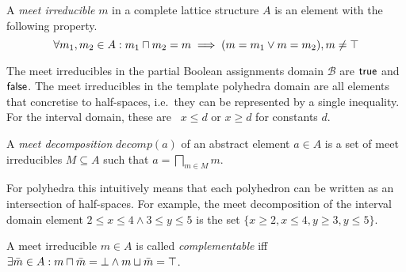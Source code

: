 \begin{definition} 
A \emph{meet irreducible} $m$ 
in a complete lattice structure $A$ is an element with the following property.
\[\forall m_1, m_2 \in A: m_1 \sqcap m_2 = m \implies (m = m_1 \lor m = m_2), m \neq \top \]  
\end{definition}

The meet irreducibles in the partial Boolean assignments domain
$\mathcal{B}$ are $\mathsf{true}$ and $\mathsf{false}$. The meet irreducibles in the
template polyhedra domain are all elements that concretise to
half-spaces, i.e.\ they can be represented by a single inequality. For
the interval domain, these are \ $x \leq d$ or $x \geq d$ for
constants $d$.


\begin{definition}
 A \emph{meet decomposition} $\mathit{decomp}(a)$ of an abstract
element $a \in A$ is a set of meet irreducibles $M \subseteq A$ such that 
$a=\bigsqcap_{m\in M} m$.
\end{definition}

For polyhedra this intuitively means that each polyhedron can be
written as an intersection of half-spaces.
%
For example, the meet decomposition of the interval domain element
$2\leq x\leq 4 \wedge 3\leq y\leq 5$ is
the set $\{x\geq 2, x\leq 4, y\geq 3, y\leq 5\}$.

\begin{definition} 
A meet irreducible $m\in A$ is called \emph{complementable} iff $\exists
\bar{m} \in A: m\sqcap\bar{m}=\bot \wedge m\sqcup\bar{m}=\top$.  
\end{definition}


